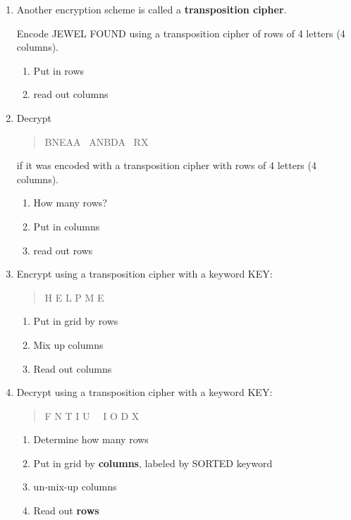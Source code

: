 \documentclass[12pt]{article}
\renewcommand{\emph}[1]{\textsf{\textbf{#1}}}
\newcommand{\be}{\begin{enumerate}}
\newcommand{\ee}{\end{enumerate}}
\begin{document}
\begin{enumerate}
\begin{enumerate}
	\vfill
	
	\item Which substitution is, in general, harder to break, a shift cipher or one that is not a shift cipher?
	
	\vfill
	
	\item What strategies would you use to try to break a substitution cipher that is not a shift cipher?
	\vfill
	\end{enumerate}
	
	\newpage
	
\item Another encryption scheme is called a \emph{transposition cipher}. 

Encode \textsf{JEWEL FOUND} using a transposition cipher of rows of 4 letters (4 columns).

\be
\item Put in rows
	
\item read out columns

\ee

\vfill

\item Decrypt \begin{quote} \textsf{BNEAA \ ANBDA \ RX } \end{quote}
if it was encoded with a transposition cipher with  rows of 4 letters (4 columns).

\be
\item How many rows? 

\item Put in columns
	
\item read out rows

\ee

\vfill

\item Encrypt using a transposition cipher with a keyword {\sf KEY}: \begin{quote}\textsf{ H E L P M E }\end{quote}
\be
\item Put in grid by rows

\item Mix up columns

\item Read out columns

\ee

\vfill

\item Decrypt using a transposition cipher with a keyword {\sf KEY}: 
\begin{quote} \textsf{F N T I U \ \ I O D X} \end{quote}

\be
\item Determine how many rows

\item Put in grid by \emph{columns}, labeled by SORTED keyword

\item un-mix-up columns

\item Read out \emph{rows}

\ee

\vfill


\end{enumerate}
\end{document}
